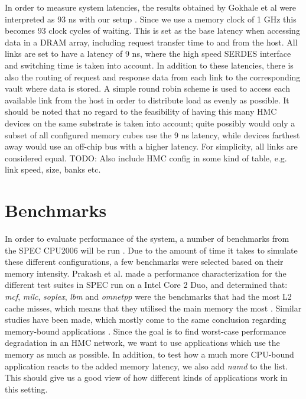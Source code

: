 In order to measure system latencies, the results obtained by Gokhale et al were interpreted as 93 ns with our setup \cite{10.1145/2833179.2833184}. Since we use a memory clock of 1 GHz this becomes 93 clock cycles of waiting. This is set as the base latency when accessing data in a DRAM array, including request transfer time to and from the host. All links are set to have a latency of 9 ns, where the high speed SERDES interface and switching time is taken into account. In addition to these latencies, there is also the routing of request and response data from each link to the corresponding vault where data is stored. A simple round robin scheme is used to access each available link from the host in order to distribute load as evenly as possible. It should be noted that no regard to the feasibility of having this many HMC devices on the same substrate is taken into account; quite possibly would only a subset of all configured memory cubes use the 9 ns latency, while devices farthest away would use an off-chip bus with a higher latency. For simplicity, all links are considered equal.
TODO: Also include HMC config in some kind of table, e.g. link speed, size, banks etc.


\section{Benchmarks} \label{method-benches}
In order to evaluate performance of the system, a number of benchmarks from the SPEC CPU2006 will be run \cite{henning2006spec}. Due to the amount of time it takes to simulate these different configurations, a few benchmarks were selected based on their memory intensity. Prakash et al. made a performance characterization for the different test suites in SPEC run on a Intel Core 2 Duo, and determined that: \emph{mcf}, \emph{milc}, \emph{soplex}, \emph{lbm} and \emph{omnetpp} were the benchmarks that had the most L2 cache misses, which means that they utilised the main memory the most \cite{prakash2008performance}. Similar studies have been made, which mostly come to the same conclusion regarding memory-bound applications \cite{4664856} \cite{4086140} \cite{bird2007performance}. Since the goal is to find worst-case performance degradation in an HMC network, we want to use applications which use the memory as much as possible. In addition, to test how a much more CPU-bound application reacts to the added memory latency, we also add \emph{namd} to the list. This should give us a good view of how different kinds of applications work in this setting. 
\bigskip

